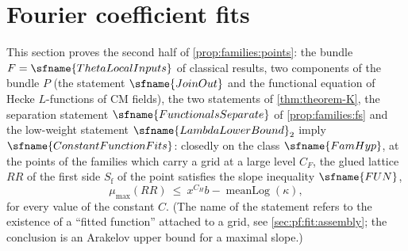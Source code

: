 \section{Fourier coefficient fits}\label{sec:pf:fit}

\providecommand{\fitFUN}{\sfname{FUN}}
\providecommand{\fitmlog}{\operatorname{meanLog}}
\providecommand{\fitmi}[1]{\langle #1\rangle_{\infty}}
\providecommand{\fitht}{\operatorname{ht}}
\providecommand{\fitwt}{\operatorname{wt}}
\providecommand{\fitden}{\mathfrak{a}}
\providecommand{\fitClosed}{\sfname{Closed}}
\providecommand{\fitEv}{\mathrm{Ev}}
\providecommand{\fitPC}{\mathrm{PC}}
\providecommand{\fitRR}{\mathit{RR}}
\providecommand{\fitmumax}{\mu_{\max}}
\providecommand{\fitmumin}{\mu_{\min}}
\providecommand{\fitbudget}{\mathcal{G}}
\providecommand{\fitpol}{\operatorname{pol}}
\providecommand{\fitSq}{\mathrm{Sq}}
\providecommand{\fitGBig}{\sfname{GBig}}
\providecommand{\fitBigC}{\sfname{BigC}}
\providecommand{\fitFit}{\mathrm{Fit}}

This section proves the second half of \cref{prop:families:points}: the bundle $F=\sfname{ThetaLocalInputs}$ of
classical results, two components of the bundle $P$ (the statement $\sfname{JoinOut}$ and the functional equation of
Hecke $L$-functions of CM fields), the two statements of \cref{thm:theorem-K}, the separation statement
$\sfname{FunctionalsSeparate}$ of \cref{prop:families:fs} and the low-weight statement $\sfname{LambdaLowerBound}_2$
imply $\sfname{ConstantFunctionFits}$: closedly on the class $\sfname{FamHyp}$, at the points of the families which
carry a grid at a large level $C_F$, the glued lattice $\fitRR$ of the first side $S_{\mathrm f}$ of the point
satisfies the slope inequality $\fitFUN$,
\begin{equation}\label{eq:pf:fit:FUN}
\fitmumax(\fitRR)\ \le\ x^{C_H}b-\fitmlog(\kappa),
\end{equation}
for every value of the constant $C$. (The name of the statement refers to the existence of a ``fitted function''
attached to a grid, see \cref{sec:pf:fit:assembly}; the conclusion is an Arakelov upper bound for a maximal
slope.)

